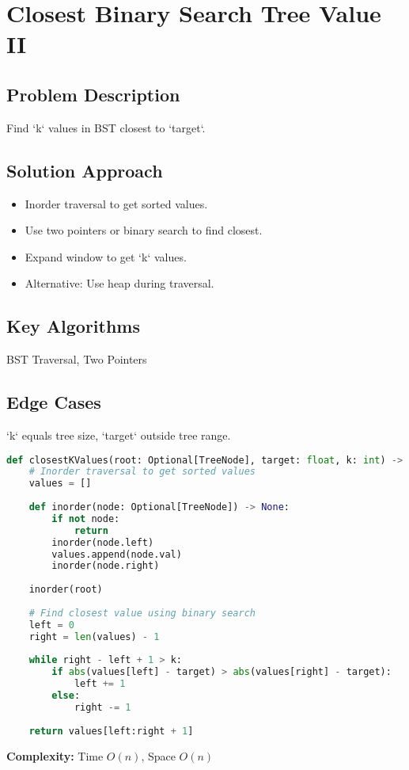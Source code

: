 \documentclass[10pt, a4paper]{article}
\begin{document}
\section{Closest Binary Search Tree Value II}
\subsection*{Problem Description}
Find `k` values in BST closest to `target`.

\subsection*{Solution Approach}
\begin{itemize}
    \item Inorder traversal to get sorted values.
    \item Use two pointers or binary search to find closest.
    \item Expand window to get `k` values.
    \item Alternative: Use heap during traversal.
\end{itemize}

\subsection*{Key Algorithms}
BST Traversal, Two Pointers

\subsection*{Edge Cases}
`k` equals tree size, `target` outside tree range.

\begin{lstlisting}[language=Python]
def closestKValues(root: Optional[TreeNode], target: float, k: int) -> List[int]:
    # Inorder traversal to get sorted values
    values = []
    
    def inorder(node: Optional[TreeNode]) -> None:
        if not node:
            return
        inorder(node.left)
        values.append(node.val)
        inorder(node.right)
    
    inorder(root)
    
    # Find closest value using binary search
    left = 0
    right = len(values) - 1
    
    while right - left + 1 > k:
        if abs(values[left] - target) > abs(values[right] - target):
            left += 1
        else:
            right -= 1
    
    return values[left:right + 1]
\end{lstlisting}
\textbf{Complexity:} Time $O(n)$, Space $O(n)$
\end{document}
